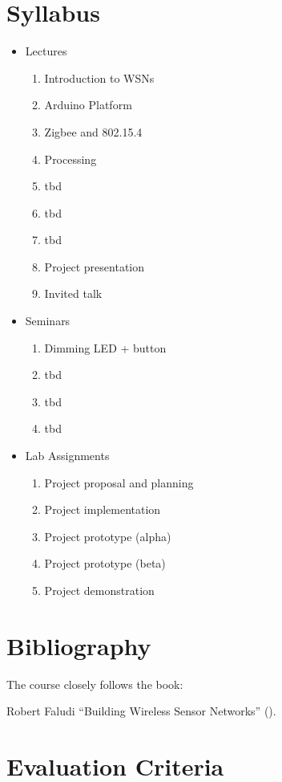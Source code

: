 \section{Syllabus}
\begin{itemize}
  \item Lectures
  \begin{enumerate}
    \item Introduction to WSNs
    \item Arduino Platform
    \item Zigbee and 802.15.4
    \item Processing
    \item tbd
    \item tbd
    \item tbd
    \item Project presentation
    \item Invited talk
  \end{enumerate}
  \item Seminars
  \begin{enumerate}
    \item Dimming LED + button
    \item tbd
    \item tbd
    \item tbd
  \end{enumerate}
\item Lab Assignments
  \begin{enumerate}
    \item Project proposal and planning
    \item Project implementation
    \item Project prototype (alpha)
    \item Project prototype (beta)
    \item Project demonstration
  \end{enumerate}
\end{itemize}

\section{Bibliography}

The course closely follows the book:

Robert Faludi ``Building Wireless Sensor Networks'' (\cite{faludi2010bws}).

\section{Evaluation Criteria}

